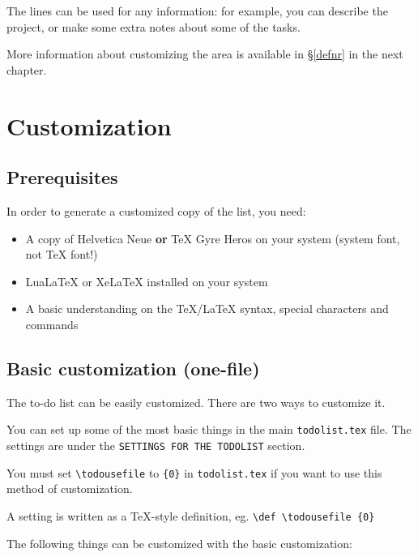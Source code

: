 \documentclass[a4paper,english]{report}
\numberwithin{equation}{section}
\newcommand{\ltcs}[1]{\texttt{\textbackslash#1}}
\begin{document}
The lines can be used for any information: for example, you can describe the project, or make some extra notes about some of the tasks.

More information about customizing the area is available in §\ref{defnr} in the next chapter.

\chapter{Customization}
\label{customization}
\section{Prerequisites}

In order to generate a customized copy of the list, you need:

\begin{itemize}
\item A copy of Helvetica Neue \textbf{or} \TeX{} Gyre Heros on your system (system font, not \TeX{} font!)
\item Lua\LaTeX{} or Xe\LaTeX{} installed on your system
\item A basic understanding on the \TeX{}/\LaTeX{} syntax, special characters and commands
\end{itemize}

\section{Basic customization (one-file)}
\label{basic}

The to-do list can be easily customized.  There are two ways to customize it.

You can set up some of the most basic things in the main \texttt{todolist.tex} file.  The settings are under the \texttt{SETTINGS FOR THE TODOLIST} section.

You must set \ltcs{todousefile} to \texttt{\{0\}} in \texttt{todolist.tex} if you want to use this method of customization.

A setting is written as a \TeX-style definition, eg. \texttt{\ltcs{def} \ltcs{todousefile} \{0\}}

The following things can be customized with the basic customization:
\end{document}
